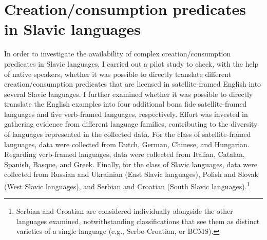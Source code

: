 \documentclass[output=paper,colorlinks,citecolor=brown]{langscibook}
\begin{document}
\section{Creation/consumption predicates in Slavic languages}\label{2}

In order to investigate the availability of complex creation/consumption predicates in Slavic languages, I carried out a pilot study to check, with the help of native speakers, whether it was possible to directly translate %
different creation/con\-sump\-tion predicates that are licensed in satellite-framed English into several Slavic languages. I further examined whether it was possible to directly translate the English examples into four additional bona fide satellite-framed languages %
and five verb-framed languages, %
respectively. %
Effort was invested in gathering evidence from different language families, contributing to the diversity of languages represented in the collected data. %
For the class of satellite-framed languages, data were collected from Dutch, German, Chinese, and Hungarian. Regarding verb-framed languages, data were collected from Italian, Catalan, Spanish, Basque, and Greek. Finally, for the class of Slavic languages, data were collected from Russian and Ukrainian (East Slavic languages), Polish and Slovak (West Slavic languages), and Serbian and Croatian (South Slavic languages).\footnote{Serbian and Croatian are considered individually alongside the other languages examined, notwithstanding classifications that see them as distinct varieties of a single language (e.g., Serbo-Croatian, or BCMS).}
\end{document}
